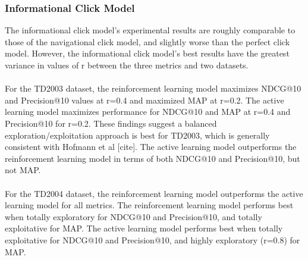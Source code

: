 \documentclass{acm_proc_article-sp}
\begin{document}
\subsubsection{Informational Click Model}
The informational click model’s experimental results are roughly comparable to those of the navigational click model, and slightly worse than the perfect click model.  However, the informational click model’s best results have the greatest variance in values of r between the three metrics and two datasets.   \\ \\
For the TD2003 dataset, the reinforcement learning model maximizes NDCG@10 and Precision@10 values at r=0.4 and maximized MAP at r=0.2.  The active learning model maximizes performance for NDCG@10 and MAP at r=0.4 and Precision@10 for r=0.2.  These findings suggest a balanced exploration/exploitation approach is best for TD2003, which is generally consistent with Hofmann et al [cite].  The active learning model outperforms the reinforcement learning model in terms of both NDCG@10 and Precision@10, but not MAP. \\ \\
For the TD2004 dataset, the reinforcement learning model outperforms the active learning model for all metrics.  The reinforcement learning model performs best when totally exploratory for NDCG@10 and Precision@10, and totally exploitative for MAP.  The active learning model performs best when totally exploitative for NDCG@10 and Precision@10, and highly exploratory (r=0.8) for MAP.   
\end{document}
